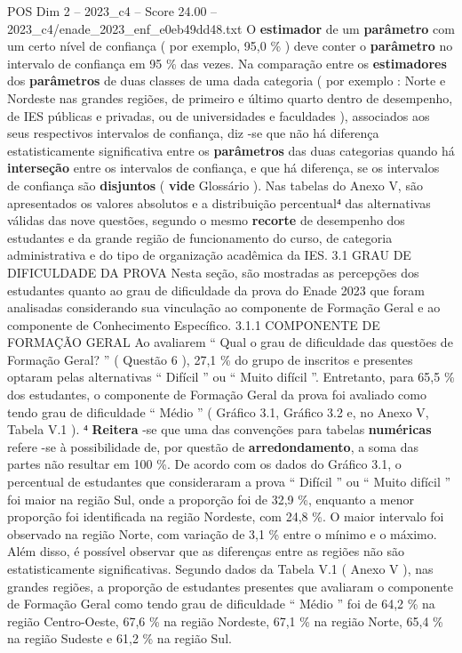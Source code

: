 \begin{textsample}{POS Dim 2 – 2023\_c4 – Score 24.00 – 2023\_c4/enade\_2023\_enf\_e0eb49dd48.txt}
O \textbf{estimador} de um \textbf{parâmetro} com um certo nível de confiança ( por exemplo, 95,0 \% ) deve conter o \textbf{parâmetro} no intervalo de confiança em 95 \% das vezes.
Na comparação entre os \textbf{estimadores} dos \textbf{parâmetros} de duas classes de uma dada categoria ( por exemplo : Norte e Nordeste nas grandes regiões, de primeiro e último quarto dentro de desempenho, de IES públicas e privadas, ou de universidades e faculdades ), associados aos seus respectivos intervalos de confiança, diz -se que não há diferença estatisticamente significativa entre os \textbf{parâmetros} das duas categorias quando há \textbf{interseção} entre os intervalos de confiança, e que há diferença, se os intervalos de confiança são \textbf{disjuntos} ( \textbf{vide} Glossário ).
Nas tabelas do Anexo V, são apresentados os valores absolutos e a distribuição percentual⁴ das alternativas válidas das nove questões, segundo o mesmo \textbf{recorte} de desempenho dos estudantes e da grande região de funcionamento do curso, de categoria administrativa e do tipo de organização acadêmica da IES. 3.1 GRAU DE DIFICULDADE DA PROVA Nesta seção, são mostradas as percepções dos estudantes quanto ao grau de dificuldade da prova do Enade 2023 que foram analisadas considerando sua vinculação ao componente de Formação Geral e ao componente de Conhecimento Específico. 3.1.1 COMPONENTE DE FORMAÇÃO GERAL Ao avaliarem “ Qual o grau de dificuldade das questões de Formação Geral? ” ( Questão 6 ), 27,1 \% do grupo de inscritos e presentes optaram pelas alternativas “ Difícil ” ou “ Muito difícil ”.
Entretanto, para 65,5 \% dos estudantes, o componente de Formação Geral da prova foi avaliado como tendo grau de dificuldade “ Médio ” ( Gráfico 3.1, Gráfico 3.2 e, no Anexo V, Tabela V.1 ). ⁴ \textbf{Reitera} -se que uma das convenções para tabelas \textbf{numéricas} refere -se à possibilidade de, por questão de \textbf{arredondamento}, a soma das partes não resultar em 100 \%.
De acordo com os dados do Gráfico 3.1, o percentual de estudantes que consideraram a prova “ Difícil ” ou “ Muito difícil ” foi maior na região Sul, onde a proporção foi de 32,9 \%, enquanto a menor proporção foi identificada na região Nordeste, com 24,8 \%.
O maior intervalo foi observado na região Norte, com variação de 3,1 \% entre o mínimo e o máximo.
Além disso, é possível observar que as diferenças entre as regiões não são estatisticamente significativas.
Segundo dados da Tabela V.1 ( Anexo V ), nas grandes regiões, a proporção de estudantes presentes que avaliaram o componente de Formação Geral como tendo grau de dificuldade “ Médio ” foi de 64,2 \% na região Centro-Oeste, 67,6 \% na região Nordeste, 67,1 \% na região Norte, 65,4 \% na região Sudeste e 61,2 \% na região Sul.

\end{textsample}

